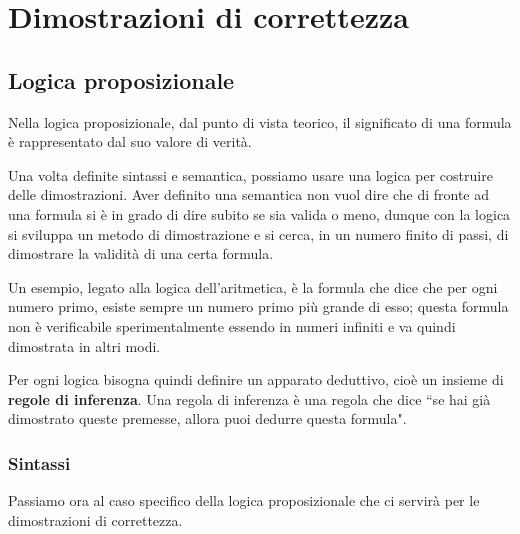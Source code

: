\chapter{Dimostrazioni di correttezza}
\section{Logica proposizionale}
Nella logica proposizionale, dal punto di vista teorico, il significato di una
formula è rappresentato dal suo valore di verità.

Una volta definite sintassi e semantica, possiamo usare una logica per costruire
delle dimostrazioni. Aver definito una semantica non vuol dire che di fronte ad
una formula si è in grado di dire subito se sia valida o meno, dunque con la logica
si sviluppa un metodo di dimostrazione e si cerca, in un numero finito di passi,
di dimostrare la validità di una certa formula.

Un esempio, legato alla logica dell'aritmetica, è la formula che dice che per ogni
numero primo, esiste sempre un numero primo più grande di esso; questa formula
non è verificabile sperimentalmente essendo in numeri infiniti e va quindi
dimostrata in altri modi.

Per ogni logica bisogna quindi definire un apparato deduttivo, cioè un insieme di
\textbf{regole di inferenza}. Una regola di inferenza è una regola che dice ``se
hai già dimostrato queste premesse, allora puoi dedurre questa formula".
\subsection{Sintassi}
Passiamo ora al caso specifico della logica proposizionale che ci servirà per le
dimostrazioni di correttezza.

